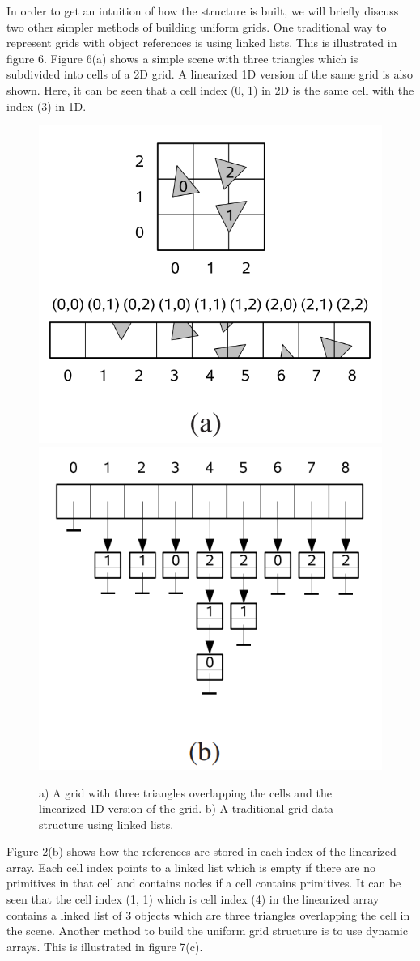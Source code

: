 \documentclass[11pt,a4paper]{article}
\begin{document}
In order to get an intuition of how the structure is built, we will briefly discuss two other simpler methods of building uniform grids. One traditional way to represent grids with object references is using linked lists. This is illustrated in figure 6. Figure 6(a) shows a simple scene with three triangles which is subdivided into cells of a 2D grid. A linearized 1D version of the same grid is also shown. Here, it can be seen that a cell index (0, 1) in 2D is the same cell with the index (3) in 1D.
\begin{figure}[H]
	\centering
	\captionsetup{justification=centering}
	\includegraphics[width=.28\textwidth]{uniformgrids1}\quad
	\includegraphics[width=.28\textwidth]{uniformgrids2}\quad
	\caption{a) A grid with three triangles overlapping the cells and the linearized 1D version of the grid. b) A traditional grid data structure using linked lists. \protect\cite{lagae2008compact}}
\end{figure}
Figure 2(b) shows how the references are stored in each index of the linearized array. Each cell index points to a linked list which is empty if there are no primitives in that cell and contains nodes if a cell contains primitives. It can be seen that the cell index (1, 1) which is cell index (4) in the linearized array contains a linked list of 3 objects which are three triangles overlapping the cell in the scene. Another method to build the uniform grid structure is to use dynamic arrays. This is illustrated in figure 7(c).
\end{document}
